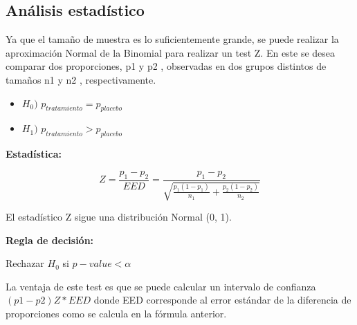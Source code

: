 \documentclass[
]{article}
\begin{document}
\subsection{Análisis estadístico}\label{anuxe1lisis-estaduxedstico}

Ya que el tamaño de muestra es lo suficientemente grande, se puede
realizar la aproximación Normal de la Binomial para realizar un test Z.
En este se desea comparar dos proporciones, p1 y p2 , observadas en dos
grupos distintos de tamaños n1 y n2 , respectivamente.

\begin{itemize}
\item
  \(H_0)\) \(p_{tratamiento}=p_{placebo}\)
\item
  \(H_1)\) \(p_{tratamiento} > p_{placebo}\)
\end{itemize}

\textbf{Estadística:}

\[
Z = \frac{p_1 - p_2}{EED} = \frac{p_1 - p_2}{\sqrt{\frac{p_1 (1 - p_1)}{n_1} + \frac{p_2 (1 - p_2)}{n_2}}}
\]

El estadístico Z sigue una distribución Normal (0, 1).

\textbf{Regla de decisión:}

Rechazar \(H_0\) si \(p-value < \alpha\)

La ventaja de este test es que se puede calcular un intervalo de
confianza \((p1-p2 ) Z* EED\) donde EED corresponde al error estándar de
la diferencia de proporciones como se calcula en la fórmula anterior.
\end{document}
